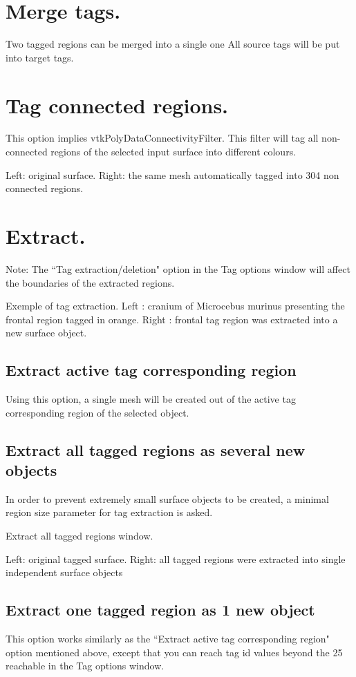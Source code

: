 \section{Merge tags.}
Two tagged regions can be merged into a single one
All source tags will be put into target tags.

\section{Tag connected regions.}
This option implies vtkPolyDataConnectivityFilter. This filter will tag all non-connected regions of the
selected input surface into different colours.


Left: original surface. Right: the same mesh automatically tagged into 304 non connected regions.

\section{Extract.}
Note: The ``Tag extraction/deletion" option in the Tag options window will affect the boundaries of
the extracted regions.

Exemple of tag extraction. Left : cranium of Microcebus murinus presenting the frontal region
tagged in orange. Right : frontal tag region was extracted into a new surface object.

\subsection{Extract active tag corresponding region}
Using this option, a single mesh will be created out of the active tag corresponding region of the
selected object.

\subsection{Extract all tagged regions as several new objects}
In order to prevent extremely small surface objects to be
created, a minimal region size parameter for tag extraction is
asked.

Extract all tagged regions window.


Left: original tagged surface. Right: all tagged regions were extracted into single independent
surface objects

\subsection{Extract one tagged region as 1 new object}
This option works similarly as the ``Extract active tag
corresponding region" option mentioned above, except that
you can reach tag id values beyond the 25 reachable in the
Tag options window.

